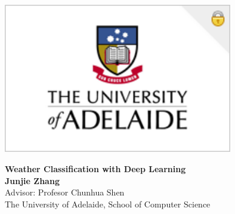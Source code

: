 \documentclass[a0,portrait]{a0poster}
\begin{document}
\newcommand*{\justifyheading}{\raggedleft}

\begin{minipage}[b]{0.15\linewidth}
\includegraphics[width=10cm]{uni_logo.png}\\
\end{minipage}

\begin{minipage}[!b]{0.85\linewidth}
\VeryHuge\justifyheading \color{NavyBlue} \textbf{Weather Classification with Deep Learning} \color{Black}\\ %


\huge \textbf{Junjie Zhang}\\[0.6cm] %
\huge Advisor: Profesor Chunhua Shen \\[0.5cm] %
\huge The University of Adelaide, School of Computer Science \\[0.5cm] %
\end{minipage}
%
\end{document}

